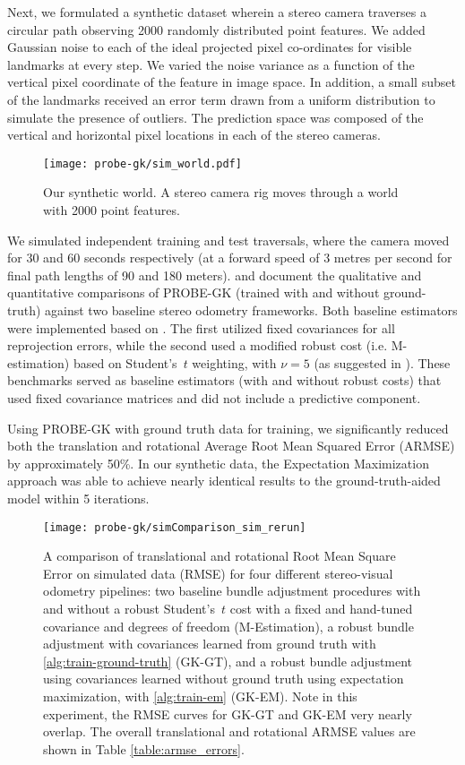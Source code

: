 Next, we formulated a synthetic dataset wherein a stereo camera traverses a circular path observing 2000 randomly distributed point features.
We added Gaussian noise to each of the ideal projected
pixel co-ordinates for visible landmarks at every step. We varied the noise variance as a function of the vertical pixel coordinate of
the feature in image space. In addition, a small subset of the landmarks received an error term drawn from a uniform distribution to simulate the presence of outliers. The prediction space was composed of
the vertical and horizontal pixel locations in each of the stereo cameras.

\begin{figure}
\centering
   \texttt{[image: probe-gk/sim\_world.pdf]}
   \label{fig:SimWorld} 
\caption{Our synthetic world. A stereo camera rig moves through a world with 2000 point features.}
\end{figure}

We simulated independent training and test traversals, where the camera moved for
30 and 60 seconds respectively (at a forward speed of 3 metres per second for final path
lengths of 90 and 180 meters).   and  document the qualitative and quantitative comparisons of PROBE-GK (trained with and without ground-truth) against two baseline stereo odometry frameworks. Both baseline estimators were implemented based on . The first utilized fixed covariances for all reprojection errors, while the second used a modified robust cost (i.e. M-estimation) based on Student's~$t$ weighting, with $\nu = 5$ (as suggested in \cite{kerl2013robust}).  These benchmarks served as baseline estimators (with and without robust costs) that used fixed covariance matrices and did not include a predictive component. 

Using PROBE-GK with ground truth data for training,
we significantly reduced both the translation and rotational Average Root Mean Squared Error (ARMSE)
by approximately 50\%. In our synthetic data, the Expectation Maximization approach was able to achieve nearly identical results to the ground-truth-aided model within 5 iterations.  

\begin{figure}
    \centering
    \texttt{[image: probe-gk/simComparison\_sim\_rerun]}
    \caption{A comparison of translational and rotational Root Mean Square Error on simulated data
    (RMSE) for four different stereo-visual odometry pipelines: two baseline
    bundle adjustment procedures with and without a robust Student's~$t$ cost with a fixed and
    hand-tuned covariance and degrees of freedom (M-Estimation), a robust bundle
    adjustment with covariances learned from ground truth with
    \cref{alg:train-ground-truth} (GK-GT), and a robust bundle adjustment using
    covariances learned without ground truth using expectation maximization,
    with \cref{alg:train-em} (GK-EM). Note in this experiment, the RMSE curves
    for GK-GT and GK-EM very nearly overlap. The overall translational and
    rotational ARMSE values are shown in Table \ref{table:armse_errors}.} 
    \label{fig:sim_comparison}
\end{figure}

